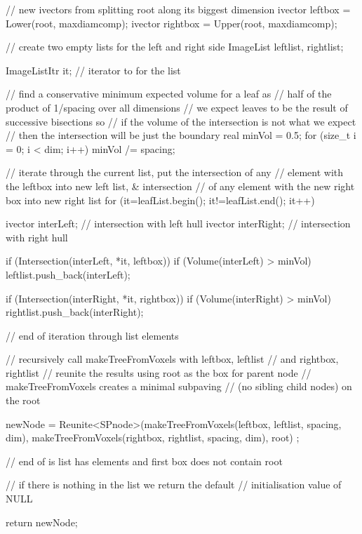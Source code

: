 \begin{DoxyCode}
{{{                // new ivectors from splitting root along its biggest dimension
                ivector leftbox = Lower(root, maxdiamcomp);
                ivector rightbox = Upper(root, maxdiamcomp);

                // create two empty lists for the left and right side
                ImageList leftlist, rightlist;

                ImageListItr it; // iterator to for the list

                // find a conservative minimum expected volume for a leaf as
                // half of the product of 1/spacing over all dimensions
                // we expect leaves to be the result of successive bisections
       so
                // if the volume of the intersection is not what we expect
                // then the intersection will be just the boundary
                real minVol = 0.5;
                for (size_t i = 0; i < dim; i++) minVol /= spacing;

                // iterate through the current list, put the intersection of
       any
                // element with the leftbox into new left list, & intersection
                // of any element with the new right box into new right list
                for (it=leafList.begin(); it!=leafList.end(); it++) {
                    ivector interLeft;  // intersection with left hull
                    ivector interRight;  // intersection with right hull

                    if (Intersection(interLeft, *it, leftbox)) {
                        if (Volume(interLeft) > minVol)
                            leftlist.push_back(interLeft);
                    }

                    if (Intersection(interRight, *it, rightbox)) {
                        if (Volume(interRight) > minVol)
                            rightlist.push_back(interRight);
                    }

                } // end of iteration through list elements

                // recursively call makeTreeFromVoxels with leftbox, leftlist
                // and rightbox, rightlist
                // reunite the results using root as the box for parent node
                // makeTreeFromVoxels creates a minimal subpaving
                // (no sibling child nodes) on the root

                newNode = Reunite<SPnode>(makeTreeFromVoxels(leftbox,
                                                leftlist, spacing, dim),
                                    makeTreeFromVoxels(rightbox,
                                                rightlist, spacing, dim), root)
      ;

            } // end of is list has elements and first box does not contain
       root
        }

        // if there is nothing in the list we return the default
            // initialisation value of NULL

        return newNode;

    }
\end{DoxyCode}
